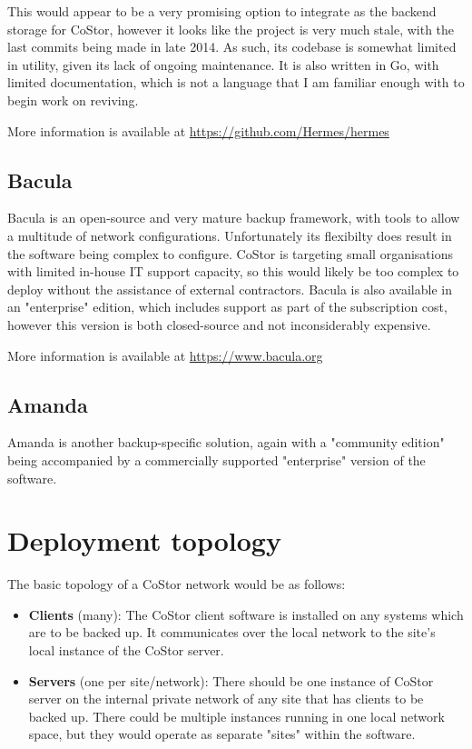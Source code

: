 \documentclass[bsc,frontabs,twoside,singlespacing,parskip,deptreport]{infthesis}     %
\begin{document}
This would appear to be a very promising option to integrate as the backend storage for CoStor,
however it looks like the project is very much stale, with the last commits being made in late 
2014. As such, its codebase is somewhat limited in utility, given its lack of ongoing 
maintenance. It is also written in Go, with limited documentation, which is not a language
that I am familiar enough with to begin work on reviving.

More information is available at \url{https://github.com/Hermes/hermes} \cite{hermes}

\subsection{Bacula}

Bacula is an open-source and very mature backup framework, with tools to allow a multitude of
network configurations. Unfortunately its flexibilty does result in the software being complex
to configure. CoStor is targeting small organisations with limited in-house IT support capacity,
so this would likely be too complex to deploy without the assistance of external contractors. 
Bacula is also available in an "enterprise" edition\cite{bacula-ent}, which includes 
support as part of the subscription cost, however this version is both closed-source and
not inconsiderably expensive.

More information is available at \url{https://www.bacula.org} \cite{bacula}

\subsection{Amanda}

Amanda is another backup-specific solution, again with a "community edition" being accompanied
by a commercially supported "enterprise" version of the software.



\section{Deployment topology}

The basic topology of a CoStor network would be as follows:

\begin{itemize}
	\item \textbf{Clients} (many):
	\subitem The CoStor client software is installed on any systems which are to be backed up.
	It communicates over the local network to the site's local instance of the CoStor server.
	
	\item \textbf{Servers} (one per site/network):
	\subitem  There should be one instance of CoStor server on the internal private network of 
	any site that has clients to be backed up. There could be multiple instances running in one
	local network space, but they would operate as separate "sites" within the software.
\end{itemize}
\end{document}
